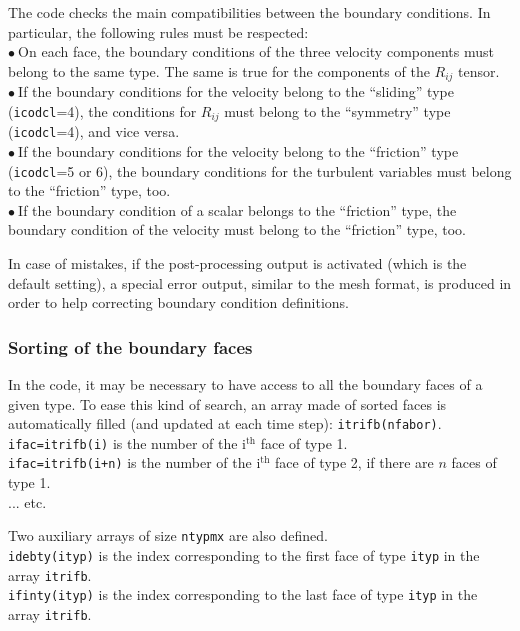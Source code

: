 {{{The code checks the main compatibilities between the boundary
conditions. In particular, the following rules must be respected: \\
$\bullet\ $On each face, the boundary conditions of the three velocity components must belong to the same type. The same is true for the components of the $R_{ij}$ tensor.\\
$\bullet\ $If the boundary conditions for the velocity belong to the
``sliding'' type (\texttt{icodcl}=4), the conditions for $R_{ij}$ must belong to
the ``symmetry'' type (\texttt{icodcl}=4), and vice versa.\\
$\bullet\ $If the boundary conditions for the velocity belong to the
``friction'' type (\texttt{icodcl}=5 or 6), the boundary conditions for the turbulent variables
must belong to the ``friction'' type, too.\\
$\bullet\ $If the boundary condition of a scalar belongs to the
``friction'' type, the boundary condition of the velocity must belong to
the ``friction'' type, too.

In case of mistakes, if the post-processing output is activated (which is the default setting),
a special error output, similar to the mesh format, is produced in order to help
correcting boundary condition definitions.

\subsubsection{Sorting of the boundary faces}

In the code, it may be necessary to have access to all the boundary
faces of a given type. To ease this kind of search, an array made of
sorted faces is automatically filled (and updated at each time step):
\texttt{itrifb(nfabor)}.\\
\texttt{ifac=itrifb(i)} is the number of the i$^{\text{th}}$  face of type
1.\\
\texttt{ifac=itrifb(i+n)} is the number of the i$^{\text{th}}$ face of type
2, if there are $n$ faces of type 1.\\
... etc.

Two auxiliary arrays of size \texttt{ntypmx} are also defined.\\
\texttt{idebty(ityp)} is the index
corresponding to the first
face of type \texttt{ityp} in the array \texttt{itrifb}.\\
\texttt{ifinty(ityp)} is the index
corresponding to the last
face of type \texttt{ityp} in the array \texttt{itrifb}.

}}}
